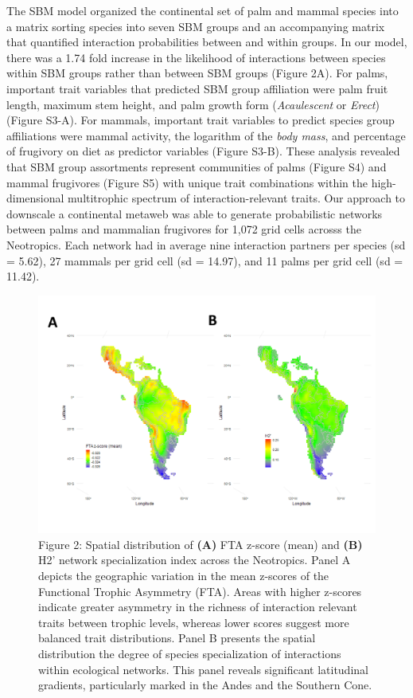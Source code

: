\documentclass[
]{agujournal2019}
\begin{document}
The SBM model organized the continental set of palm and mammal species
into a matrix sorting species into seven SBM groups and an accompanying
matrix that quantified interaction probabilities between and within
groups. In our model, there was a 1.74 fold increase in the likelihood
of interactions between species within SBM groups rather than between
SBM groups (Figure 2A). For palms, important trait variables that
predicted SBM group affiliation were palm fruit length, maximum stem
height, and palm growth form (\emph{Acaulescent} or \emph{Erect})
(Figure S3-A). For mammals, important trait variables to predict species
group affiliations were mammal activity, the logarithm of the \emph{body
mass}, and percentage of frugivory on diet as predictor variables
(Figure S3-B). These analysis revealed that SBM group assortments
represent communities of palms (Figure S4) and mammal frugivores (Figure
S5) with unique trait combinations within the high-dimensional
multitrophic spectrum of interaction-relevant traits. Our approach to
downscale a continental metaweb was able to generate probabilistic
networks between palms and mammalian frugivores for 1,072 grid cells
acrosss the Neotropics. Each network had in average nine interaction
partners per species (sd = 5.62), 27 mammals per grid cell (sd = 14.97),
and 11 palms per grid cell (sd = 11.42).

\begin{figure}

{\centering \includegraphics{Main_figures/00_network_maps.tif.png}

}

\caption{Figure 2: Spatial distribution of \textbf{(A)} FTA z-score
(mean) and \textbf{(B)} H2' network specialization index across the
Neotropics. Panel A depicts the geographic variation in the mean
z-scores of the Functional Trophic Asymmetry (FTA). Areas with higher
z-scores indicate greater asymmetry in the richness of interaction
relevant traits between trophic levels, whereas lower scores suggest
more balanced trait distributions. Panel B presents the spatial
distribution the degree of species specialization of interactions within
ecological networks. This panel reveals significant latitudinal
gradients, particularly marked in the Andes and the Southern Cone.}

\end{figure}%
\end{document}
